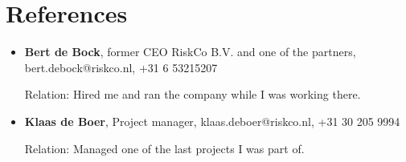 \documentclass[a4paper,10pt]{article}
\begin{document}
\section*{References}
\begin{itemize}
    \item \textbf{Bert de Bock}, former CEO RiskCo B.V. and one of the partners, bert.debock@riskco.nl, +31 6 53215207
    
    Relation: Hired me and ran the company while I was working there.
    \item \textbf{Klaas de Boer}, Project manager, klaas.deboer@riskco.nl, +31 30 205 9994
    
    Relation: Managed one of the last projects I was part of.
\end{itemize}
\end{document}

